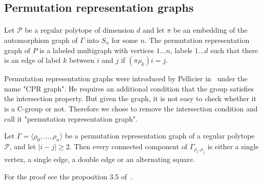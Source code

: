 \subsection{Permutation representation graphs}

\paragraph{}

\begin{definition}
  Let $\mathcal P$ be a regular polytope of dimension $d$ and let $\pi$ be an embedding of the automorphism graph of $\Gamma$ into $S_n$ for some $n$. The permutation representation graph of $P$ is a labeled multigraph with vertices ${1 \dots n}$, labels ${1 \dots d}$ such that there is an edge of label $k$ between $i$ and $j$ if $(\pi \rho_k)i = j$.
\end{definition}

Permutation representation graphs were introduced by Pellicier in~\cite{cprGraph} under the name "CPR graph". He requires an additional condition that the group satisfies the intersection property. But given the graph, it is not easy to check whether it is a C-group or not. Therefore we chose to remove the intersection condition and call it "permutation representation graph".

\begin{property}
  \label{intersection-patterns}
  Let $\Gamma = \langle \rho_0, \dots, \rho_n \rangle$ be a permutation representation graph of a regular polytope $\mathcal P$, and let $|i - j| \ge 2$. Then every connected component of $\Gamma_{\rho_i,\rho_j}$ is either a single vertex, a single edge, a double edge or an alternating square.
\end{property}

For the proof see the proposition 3.5 of~\cite{cprGraph}.
